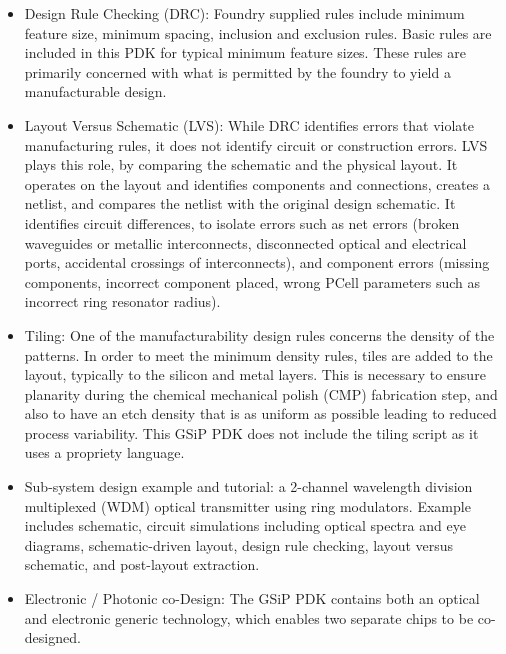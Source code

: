 \documentclass[journal]{spie}
\begin{document}
\begin{itemize}
	\item Design Rule Checking (DRC): Foundry supplied rules include minimum feature size, minimum spacing, inclusion and exclusion rules.  Basic rules are included in this PDK for typical minimum feature sizes.  These rules are primarily concerned with what is permitted by the foundry to yield a manufacturable design.   %
	\item Layout Versus Schematic (LVS):  While DRC identifies errors that violate manufacturing rules, it does not identify circuit or construction errors.  LVS plays this role, by comparing the schematic and the physical layout.  It operates on the layout and identifies components and connections, creates a netlist, and compares the netlist with the original design schematic.  It identifies circuit differences, to isolate errors such as net errors (broken waveguides or metallic interconnects, disconnected optical and electrical ports, accidental crossings of interconnects), and component errors (missing components, incorrect component placed, wrong PCell parameters such as incorrect ring resonator radius).
	\item Tiling: One of the manufacturability design rules concerns the density of the patterns.  In order to meet the minimum density rules, tiles are added to the layout, typically to the silicon and metal layers.  This is necessary to ensure planarity during the chemical mechanical polish (CMP) fabrication step, and also to have an etch density that is as uniform as possible leading to reduced process variability.  This GSiP PDK does not include the tiling script as it uses a propriety language.  
	\item Sub-system design example and tutorial: a 2-channel wavelength division multiplexed (WDM) optical transmitter using ring modulators.  Example includes schematic, circuit simulations including optical spectra and eye diagrams, schematic-driven layout, design rule checking, layout versus schematic, and post-layout extraction.
	\item Electronic / Photonic co-Design: The GSiP PDK contains both an optical and electronic generic technology, which enables two separate chips to be co-designed.  
\end{itemize}
\end{document}
